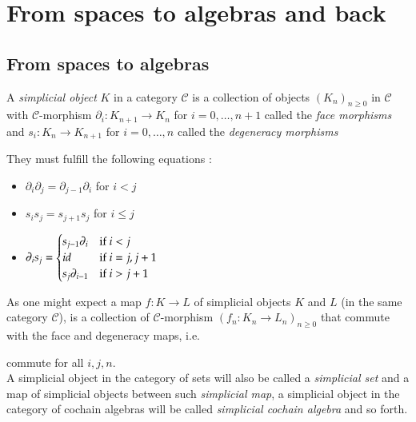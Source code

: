 
 \section{From spaces to algebras and back}
 
 \subsection{From spaces to algebras}
 
 \begin{Definition}
  A \emph{simplicial object} $K$ in a category $\mathscr{C}$
  is a collection of objects ${(K_n)}_{n \geq 0}$ in $\mathscr{C}$ with $\mathscr{C}$-morphism
  $\partial_i \colon K_{n+1} \to K_n$ for $i = 0, \ldots, n+1$ called the \emph{face morphisms} and \newline
  $s_i \colon K_n \to K_{n+1}$ for $i = 0, \ldots, n$ called the \emph{degeneracy morphisms}
  
  They must fulfill the following equations : %
  \begin{itemize}
   \item $\partial_i \partial_j = \partial_{j-1} \partial_i$ for $i < j$
   \item  $s_i s_j = s_{j+1} s_j$ for $ i \leq j$
   \item $ \partial_i s_j = \begin{cases}
              s_{j-1} \partial_i 	&\text{if $i < j$} \\
              id 	&\text{if $i = j, j+1$} \\
              s_j \partial_{i-1}	 &\text{if $ i > j + 1$}
             
             \end{cases}
    $	
    \end{itemize}
    As one might expect a map $f \colon K \to L$ of simplicial objects $K$ and $L$ (in the same category $\mathscr{C}$), is a collection
    of $\mathscr{C}$-morphism $( f_n \colon K_n \to L_n)_{ n \geq 0}$ that commute with the face and degeneracy maps, i.e.\
    
  \centerline{
  }  
    
    commute for all $i,j,n$. \\
   A simplicial object in the category of sets will also be called a \emph{simplicial set} and a map 
   of simplicial objects between such \emph{simplicial map}, a simplicial object in the category of 
   cochain algebras will be called \emph{simplicial cochain algebra} and so forth.
  
 \end{Definition}

